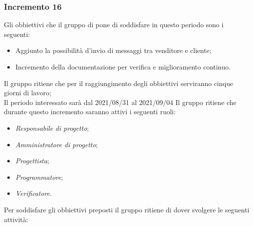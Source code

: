 \subsubsection{Incremento 16}
Gli obbiettivi che il gruppo di pone di soddisfare in questo periodo sono i seguenti:
\begin{itemize}
    \item Aggiunto la possibilità d'invio di messaggi tra venditore e cliente;
    \item Incremento della documentazione per verifica e miglioramento continuo.
\end{itemize}
Il gruppo ritiene che per il raggiungimento degli obbiettivi serviranno cinque giorni di lavoro;\\
Il periodo interessato sarà dal 2021/08/31 al 2021/09/04
Il gruppo ritiene che durante questo incremento saranno attivi i seguenti ruoli:
\begin{itemize}
    \item \textit{Responsabile di progetto};
    \item \textit{Amministratore di progetto};
    \item \textit{Progettista};
    \item \textit{Programmatore};
    \item \textit{Verificatore}.
\end{itemize}
Per soddisfare gli obbiettivi preposti il gruppo ritiene di dover svolgere le seguenti attività:
